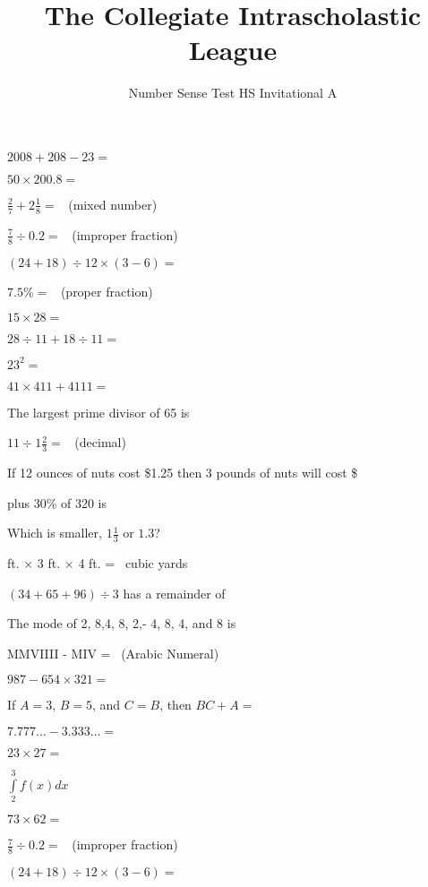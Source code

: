 \documentclass{numbersense}
\title{The Collegiate Intrascholastic League}
\subtitle{Number Sense Test \bigdot HS Invitational A \bigdot 2008}
\begin{document}
\begin{questions}

    \q[2265] $2008 + 208 - 23 = $ \ans

    \q $50 \times 200.8 = $ \ans

    \q $\frac{2}{7} + 2 \frac{1}{8} = $ \ans~(mixed number)

    \q $\frac{7}{8} \div 0.2 = $ \ans~(improper fraction)

    \q $(24 + 18) \div 12 \times (3-6) =$ \ans

    \q $7.5\% = $ \ans~(proper fraction)

    \q $15 \times 28 = $ \ans

    \q $28 \div 11 + 18 \div 11 = $ \ans

    \q $23^2 =$ \ans

    \aq[testing] $41 \times 411 + 4111=$ \ans

    \q The largest prime divisor of 65 is \ans

    \q $11 \div 1\frac{2}{3}=$ \ans~(decimal)

    \q If 12 ounces of nuts cost \$1.25 then 3 pounds of nuts will cost \$\ans

     plus 30\% of 320 is \ans

    \q Which is smaller, $1\frac{1}{3}$ or $1.3$? \ans

     ft. $ \times $ 3 ft. $\times$ 4 ft. = \ans~cubic yards

    \q $(34 + 65 + 96) \div 3$ has a remainder of \ans

    \q The mode of 2, 8,4, 8, 2,- 4, 8, 4, and 8 is \ans

    \q MMVIIII - MIV = \ans~(Arabic Numeral)

    \q $987 - 654 \times 321 = $ \ans

    \q If $A = 3$, $B=5$, and $C = B$, then $BC + A = $ \ans

    \q $7.777\ldots - 3.333\ldots = $ \ans

    \q $ 23 \times 27 = $ \ans

    \q $\int\limits_{2}^{3} f(x) dx$

    \aq $73 \times 62 =$ \ans

    \q[$4\frac{3}{8}$] $\frac{7}{8} \div 0.2 = $ \ans~(improper fraction)

    \q[-10.5] $(24 + 18) \div 12 \times (3-6) =$ \ans

\end{questions}
\end{document}
